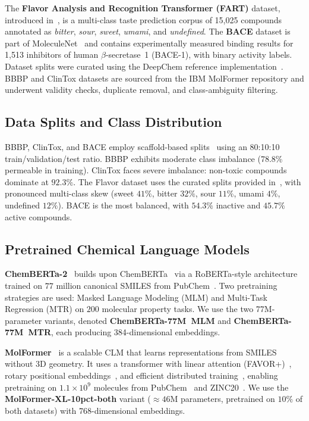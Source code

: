 \documentclass[pdflatex,sn-mathphys-num]{sn-jnl}%
\theoremstyle{thmstyleone}%
\theoremstyle{thmstyletwo}%
\theoremstyle{thmstylethree}%
\begin{document}
The \textbf{Flavor Analysis and Recognition Transformer (FART)} dataset, introduced in~\cite{zimmermann2024fart}, is a multi-class taste prediction corpus of 15,025 compounds annotated as \textit{bitter}, \textit{sour}, \textit{sweet}, \textit{umami}, and \textit{undefined}. The \textbf{BACE} dataset is part of MoleculeNet~\cite{wu2018moleculenet} and contains experimentally measured binding results for 1,513 inhibitors of human $\beta$-secretase~1 (BACE-1), with binary activity labels. Dataset splits were curated using the DeepChem reference implementation~\cite{ramsundar2019deep}. BBBP and ClinTox datasets are sourced from the IBM MolFormer repository and underwent validity checks, duplicate removal, and class-ambiguity filtering.

\subsection{Data Splits and Class Distribution} \label{data_splits_distribution}
BBBP, ClinTox, and BACE employ scaffold-based splits~\cite{ramsundar2019deep} using an 80:10:10 train/validation/test ratio. BBBP exhibits moderate class imbalance (78.8\% permeable in training). ClinTox faces severe imbalance: non-toxic compounds dominate at $92.3\%$. The Flavor dataset uses the curated splits provided in~\cite{zimmermann2024fart}, with pronounced multi-class skew (sweet $41\%$, bitter $32\%$, sour $11\%$, umami $4\%$, undefined $12\%$). BACE is the most balanced, with $54.3\%$ inactive and $45.7\%$ active compounds.

\subsection{Pretrained Chemical Language Models} \label{Pre_CLMs}
\textbf{ChemBERTa-2}~\cite{ahmad2022chemberta2} builds upon ChemBERTa~\cite{chithrananda2020chemberta} via a RoBERTa-style architecture trained on $77$ million canonical SMILES from PubChem~\cite{kim2023pubchem}. Two pretraining strategies are used: Masked Language Modeling (MLM) and Multi-Task Regression (MTR) on $200$ molecular
property tasks. We use the two 77M-parameter variants, denoted \textbf{ChemBERTa-77M~MLM} and \textbf{ChemBERTa-77M~MTR}, each producing 384-dimensional embeddings.

\textbf{MolFormer}~\cite{ross2022molformer} is a scalable CLM that learns representations from SMILES without 3D geometry. It uses a transformer with linear attention (FAVOR+)~\cite{choromanski2021rethinking}, rotary positional embeddings~\cite{heo2024rotary}, and efficient distributed training~\cite{isard2009distributed}, enabling pretraining on $1.1\times 10^{9}$  molecules from PubChem~\cite{kim2023pubchem} and ZINC20~\cite{irwin2020zinc20}. We use the \textbf{MolFormer-XL-10pct-both} variant ($\approx 46$M parameters, pretrained on $10\%$ of both datasets) with 768-dimensional embeddings.
\end{document}
